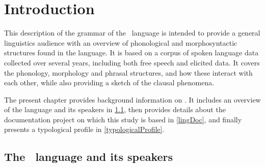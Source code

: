 


\chapter{Introduction}\label{introChapter}%

This description of the grammar of the \PS\ language is intended to provide a general linguistics audience with an overview of phonological and morphosyntactic structures found in the language. It is based on a corpus of spoken language data collected over several years, including both free speech and elicited data. It covers the phonology, morphology and phrasal structures, and how these interact with each other, while also providing a sketch of the clausal phenomena. 

The present chapter provides background information on \PS. It includes an overview of the language and its speakers in \SEC\ref{PSbackground}, then provides details about the documentation project on which this study is based in \SEC\ref{lingDoc}, and finally presents a typological profile in \SEC\ref{typologicalProfile}. 


\section{The \PS\ language and its speakers}\label{PSbackground}

